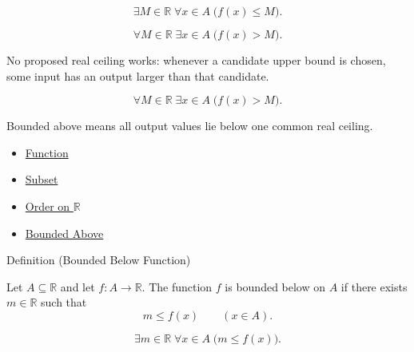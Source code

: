 \begin{remark*}
\[
  \exists M\in\mathbb{R}\;\forall x\in A\;\bigl(f(x)\leq M\bigr).
\]
\end{remark*}

\begin{remark*}
\[
  \forall M\in\mathbb{R}\;\exists x\in A\;\bigl(f(x)>M\bigr).
\]
\end{remark*}

\begin{remark*}
No proposed real ceiling works: whenever a candidate upper bound is chosen,
some input has an output larger than that candidate.
\end{remark*}

\begin{remark*}
\[
  \forall M\in\mathbb{R}\;\exists x\in A\;\bigl(f(x)>M\bigr).
\]
\end{remark*}

\begin{remark*}[Interpretation]
Bounded above means all output values lie below one common real ceiling.
\end{remark*}

\begin{dependencies}
\begin{itemize}
  \item \hyperref[def:function]{Function}
  \item \hyperref[def:subset]{Subset}
  \item \hyperref[def:order-on-r]{Order on $\mathbb{R}$}
  \item \hyperref[def:bounded-above]{Bounded Above}
\end{itemize}
\end{dependencies}

\begin{definitionbox}{Definition (Bounded Below Function)}
\begin{definition}
\label{def:function-bounded-below}
Let $A\subseteq\mathbb{R}$ and let $f:A\to\mathbb{R}$.  The function
$f$ is bounded below on $A$ if there exists $m\in\mathbb{R}$ such that
\[
  m\leq f(x)
  \qquad (x\in A).
\]
\end{definition}
\end{definitionbox}

\begin{remark*}
\[
  \exists m\in\mathbb{R}\;\forall x\in A\;\bigl(m\leq f(x)\bigr).
\]
\end{remark*}

